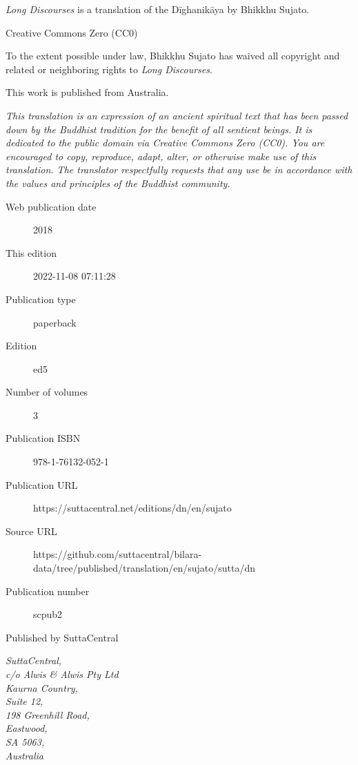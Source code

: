 \documentclass[12pt,openany]{book}%
\begin{document}
\begin{footnotesize}

\textit{Long Discourses} is a translation of the Dīghanikāya by Bhikkhu Sujato.

\medskip

Creative Commons Zero (CC0)

To the extent possible under law, Bhikkhu Sujato has waived all copyright and related or neighboring rights to \textit{Long Discourses}.

\medskip

This work is published from Australia.

\begin{center}
\textit{This translation is an expression of an ancient spiritual text that has been passed down by the Buddhist tradition for the benefit of all sentient beings. It is dedicated to the public domain via Creative Commons Zero (CC0). You are encouraged to copy, reproduce, adapt, alter, or otherwise make use of this translation. The translator respectfully requests that any use be in accordance with the values and principles of the Buddhist community.}
\end{center}

\medskip

\begin{description}
    \item[Web publication date] 2018
    \item[This edition] 2022-11-08 07:11:28
    \item[Publication type] paperback
    \item[Edition] ed5
    \item[Number of volumes] 3
    \item[Publication ISBN] 978-1-76132-052-1
    \item[Publication URL] https://suttacentral.net/editions/dn/en/sujato
    \item[Source URL] https://github.com/suttacentral/bilara-data/tree/published/translation/en/sujato/sutta/dn
    \item[Publication number] scpub2
\end{description}

\medskip

Published by SuttaCentral

\medskip

\textit{SuttaCentral,\\
c/o Alwis \& Alwis Pty Ltd\\
Kaurna Country,\\
Suite 12,\\
198 Greenhill Road,\\
Eastwood,\\
SA 5063,\\
Australia}

\end{footnotesize}
\end{document}
